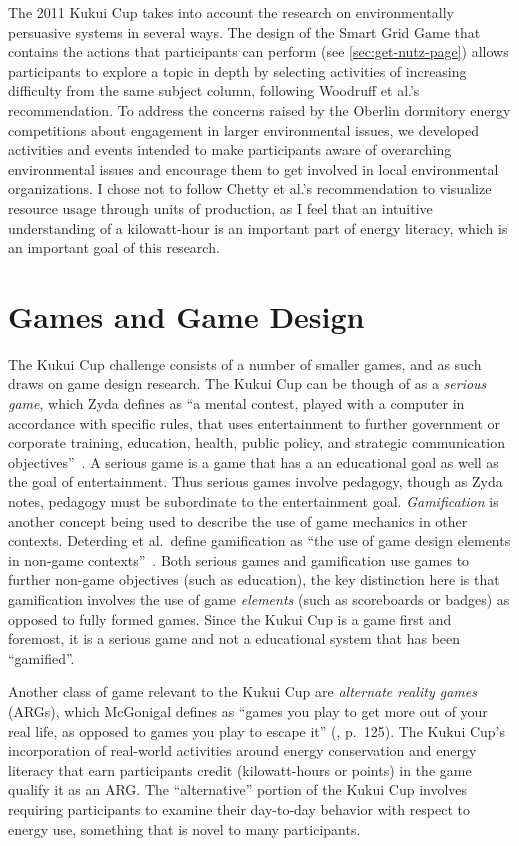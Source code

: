 The 2011 Kukui Cup takes into account the research on environmentally persuasive systems in several ways. The design of the Smart Grid Game that contains the actions that participants can perform (see \autoref{sec:get-nutz-page}) allows participants to explore a topic in depth by selecting activities of increasing difficulty from the same subject column, following Woodruff et al.'s recommendation. To address the concerns raised by the Oberlin dormitory energy competitions about engagement in larger environmental issues, we developed activities and events intended to make participants aware of overarching environmental issues and encourage them to get involved in local environmental organizations. I chose not to follow Chetty et al.'s recommendation to visualize resource usage through units of production, as I feel that an intuitive understanding of a kilowatt-hour is an important part of energy literacy, which is an important goal of this research.


\section{Games and Game Design}

The Kukui Cup challenge consists of a number of smaller games, and as such draws on game design research. The Kukui Cup can be though of as a \emph{serious game}, which Zyda defines as ``a mental contest, played with a computer in accordance with specific rules, that uses entertainment to further government or corporate training, education, health, public policy, and strategic communication objectives''~\cite{Zyda2005}. A serious game is a game that has a an educational goal as well as the goal of entertainment. Thus serious games involve pedagogy, though as Zyda notes, pedagogy must be subordinate to the entertainment goal. \emph{Gamification} is another concept being used to describe the use of game mechanics in other contexts. Deterding et al.\ define gamification as ``the use of game design elements in non-game contexts''~\cite{Deterding-2011b}. Both serious games and gamification use games to further non-game objectives (such as education), the key distinction here is that gamification involves the use of game \emph{elements} (such as scoreboards or badges) as opposed to fully formed games. Since the Kukui Cup is a game first and foremost, it is a serious game and not a educational system that has been ``gamified''.

Another class of game relevant to the Kukui Cup are \emph{alternate reality games} (ARGs), which McGonigal defines as ``games you play to get more out of your real life, as opposed to games you play to escape it'' (\cite{mcgonigal2011reality}, p.\ 125). The Kukui Cup's incorporation of real-world activities around energy conservation and energy literacy that earn participants credit (kilowatt-hours or points) in the game qualify it as an ARG. The ``alternative'' portion of the Kukui Cup involves requiring participants to examine their day-to-day behavior with respect to energy use, something that is novel to many participants.

